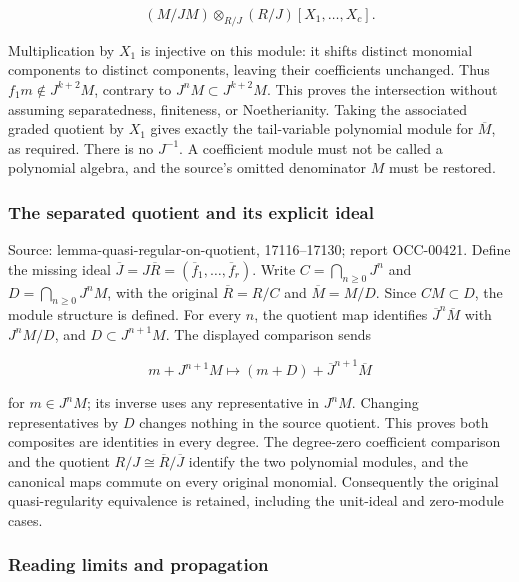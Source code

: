 \[
(M/JM)\otimes_{R/J}(R/J)[X_1,\ldots,X_c].
\]

Multiplication by \(X_1\) is injective on this module: it shifts distinct monomial components to distinct components, leaving their coefficients unchanged. Thus \(f_1m\notin J^{k+2}M\), contrary to \(J^nM\subset J^{k+2}M\). This proves the intersection without assuming separatedness, finiteness, or Noetherianity. Taking the associated graded quotient by \(X_1\) gives exactly the tail-variable polynomial module for \(\overline M\), as required. There is no \(J^{-1}\). A coefficient module must not be called a polynomial algebra, and the source's omitted denominator \(M\) must be restored.

\subsubsection{The separated quotient and its explicit ideal}\label{algebra-proof-006-the-separated-quotient-and-its-explicit-ideal}

Source: lemma-\AlgebraIdentifierBreak{}quasi-\AlgebraIdentifierBreak{}regular-\AlgebraIdentifierBreak{}on-\AlgebraIdentifierBreak{}quotient, 17116--17130; report OCC-00421. Define the missing ideal \(\overline J=J\overline R=(\overline f_1,\ldots,\overline f_r)\). Write \(C=\bigcap_{n\geq0}J^n\) and \(D=\bigcap_{n\geq0}J^nM\), with the original \(\overline R=R/C\) and \(\overline M=M/D\). Since \(CM\subset D\), the module structure is defined. For every \(n\), the quotient map identifies \(\overline J^n\overline M\) with \(J^nM/D\), and \(D\subset J^{n+1}M\). The displayed comparison sends

\[
m+J^{n+1}M\longmapsto (m+D)+\overline J^{n+1}\overline M
\]

for \(m\in J^nM\); its inverse uses any representative in \(J^nM\). Changing representatives by \(D\) changes nothing in the source quotient. This proves both composites are identities in every degree. The degree-zero coefficient comparison and the quotient \(R/J\cong\overline R/\overline J\) identify the two polynomial modules, and the canonical maps commute on every original monomial. Consequently the original quasi-regularity equivalence is retained, including the unit-ideal and zero-module cases.

\subsubsection{Reading limits and propagation}\label{algebra-proof-006-reading-limits-and-propagation}

